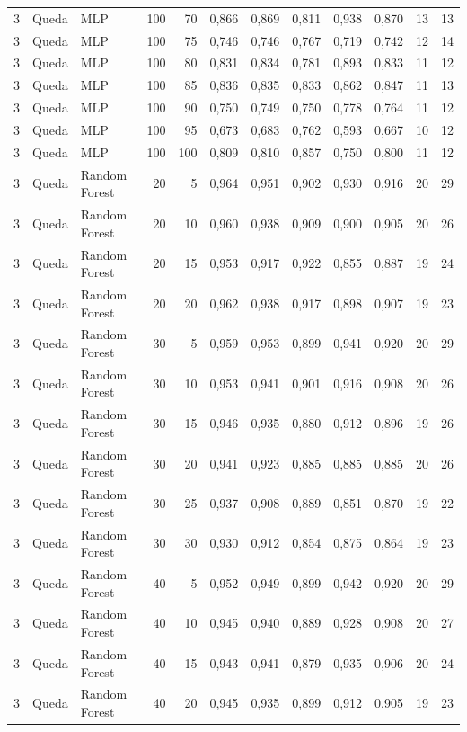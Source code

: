 \begin{longtable}{@{}rllrrrrrrrrr@{}}
3 & Queda & MLP & 100 & 70 & 0,866 & 0,869 & 0,811 & 0,938 & 0,870 & 13 & 13 \\
3 & Queda & MLP & 100 & 75 & 0,746 & 0,746 & 0,767 & 0,719 & 0,742 & 12 & 14 \\
3 & Queda & MLP & 100 & 80 & 0,831 & 0,834 & 0,781 & 0,893 & 0,833 & 11 & 12 \\
3 & Queda & MLP & 100 & 85 & 0,836 & 0,835 & 0,833 & 0,862 & 0,847 & 11 & 13 \\
3 & Queda & MLP & 100 & 90 & 0,750 & 0,749 & 0,750 & 0,778 & 0,764 & 11 & 12 \\
3 & Queda & MLP & 100 & 95 & 0,673 & 0,683 & 0,762 & 0,593 & 0,667 & 10 & 12 \\
3 & Queda & MLP & 100 & 100 & 0,809 & 0,810 & 0,857 & 0,750 & 0,800 & 11 & 12 \\
3 & Queda & Random Forest & 20 & 5 & 0,964 & 0,951 & 0,902 & 0,930 & 0,916 & 20 & 29 \\
3 & Queda & Random Forest & 20 & 10 & 0,960 & 0,938 & 0,909 & 0,900 & 0,905 & 20 & 26 \\
3 & Queda & Random Forest & 20 & 15 & 0,953 & 0,917 & 0,922 & 0,855 & 0,887 & 19 & 24 \\
3 & Queda & Random Forest & 20 & 20 & 0,962 & 0,938 & 0,917 & 0,898 & 0,907 & 19 & 23 \\
3 & Queda & Random Forest & 30 & 5 & 0,959 & 0,953 & 0,899 & 0,941 & 0,920 & 20 & 29 \\
3 & Queda & Random Forest & 30 & 10 & 0,953 & 0,941 & 0,901 & 0,916 & 0,908 & 20 & 26 \\
3 & Queda & Random Forest & 30 & 15 & 0,946 & 0,935 & 0,880 & 0,912 & 0,896 & 19 & 26 \\
3 & Queda & Random Forest & 30 & 20 & 0,941 & 0,923 & 0,885 & 0,885 & 0,885 & 20 & 26 \\
3 & Queda & Random Forest & 30 & 25 & 0,937 & 0,908 & 0,889 & 0,851 & 0,870 & 19 & 22 \\
3 & Queda & Random Forest & 30 & 30 & 0,930 & 0,912 & 0,854 & 0,875 & 0,864 & 19 & 23 \\
3 & Queda & Random Forest & 40 & 5 & 0,952 & 0,949 & 0,899 & 0,942 & 0,920 & 20 & 29 \\
3 & Queda & Random Forest & 40 & 10 & 0,945 & 0,940 & 0,889 & 0,928 & 0,908 & 20 & 27 \\
3 & Queda & Random Forest & 40 & 15 & 0,943 & 0,941 & 0,879 & 0,935 & 0,906 & 20 & 24 \\
3 & Queda & Random Forest & 40 & 20 & 0,945 & 0,935 & 0,899 & 0,912 & 0,905 & 19 & 23 \\

\end{longtable}
